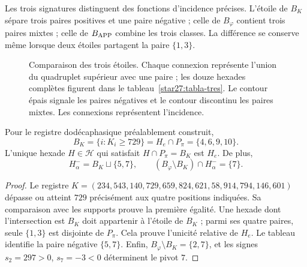 Les trois signatures distinguent des fonctions d'incidence précises.
L'étoile de \(B_K\) sépare trois paires positives et une paire négative ; celle
de \(B_\varphi\) contient trois paires mixtes ; celle de \(B_{\rm APP}\)
combine les trois classes. La différence se conserve même lorsque
deux étoiles partagent la paire \(\{1,3\}\).

\begin{figure}[htbp]
\centering
{}
\caption{Comparaison des trois étoiles. Chaque connexion représente
l'union du quadruplet supérieur avec une paire ; les douze hexades
complètes figurent dans le tableau~\ref{star27:tabla-tres}. Le contour
épais signale les paires négatives et le contour discontinu les paires mixtes.
Les connexions représentent l'incidence.}
\label{star27:figura}
\end{figure}

\begin{proposition}
\label{star27:acoplamiento}
Pour le registre dodécaphasique préalablement construit,
\[
B_K=\{i:K_i\geq729\}=H_e\cap P_\pi=\{4,6,9,10\}.
\]
L'unique hexade \(H\in\mathcal H\) qui satisfait
\(H\cap P_\pi=B_K\) est \(H_e\). De plus,
\[
H^-_\alpha=B_K\sqcup\{5,7\},\qquad
(B_\varphi\setminus B_K)\cap H^-_\alpha=\{7\}.
\]
\end{proposition}

\begin{proof}
Le registre
\(K=(234,543,140,729,659,824,621,58,914,794,146,601)\)
dépasse ou atteint \(729\) précisément aux quatre positions
indiquées. Sa comparaison avec les supports prouve la première
égalité. Une hexade dont l'intersection est \(B_K\) doit appartenir à
l'étoile de \(B_K\) ; parmi ses quatre paires, seule \(\{1,3\}\) est
disjointe de \(P_\pi\). Cela prouve l'unicité relative de \(H_e\).
Le tableau identifie la paire négative \(\{5,7\}\). Enfin,
\(B_\varphi\setminus B_K=\{2,7\}\), et les signes
\(s_2=297>0\), \(s_7=-3<0\) déterminent le pivot \(7\).
\end{proof}

